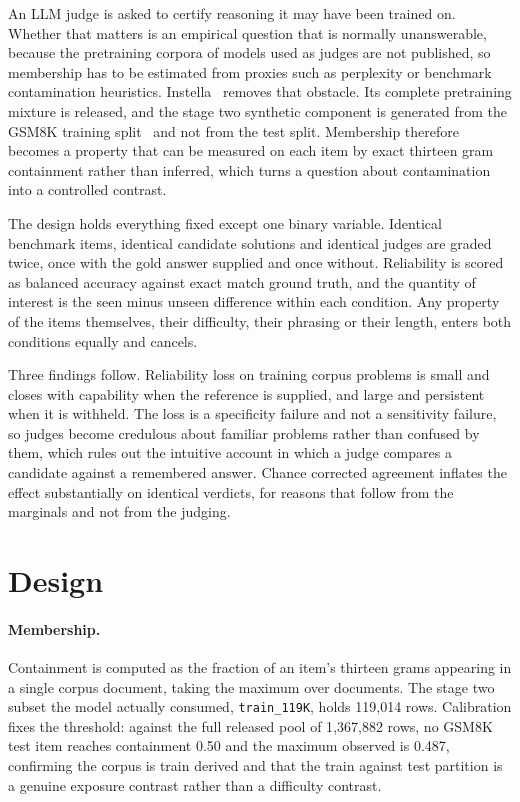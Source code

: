 An LLM judge is asked to certify reasoning it may have been trained on. Whether that matters
is an empirical question that is normally unanswerable, because the pretraining corpora of
models used as judges are not published, so membership has to be estimated from proxies such
as perplexity or benchmark contamination heuristics. Instella~\citep{instella2025} removes
that obstacle. Its complete pretraining mixture is released, and the stage two synthetic
component is generated from the GSM8K training split~\citep{cobbe2021gsm8k} and not from the
test split. Membership therefore becomes a property that can be measured on each item by
exact thirteen gram containment rather than inferred, which turns a question about
contamination into a controlled contrast.

The design holds everything fixed except one binary variable. Identical benchmark items,
identical candidate solutions and identical judges are graded twice, once with the gold
answer supplied and once without. Reliability is scored as balanced accuracy against exact
match ground truth, and the quantity of interest is the seen minus unseen difference within
each condition. Any property of the items themselves, their difficulty, their phrasing or
their length, enters both conditions equally and cancels.

Three findings follow. Reliability loss on training corpus problems is small and closes with
capability when the reference is supplied, and large and persistent when it is withheld. The
loss is a specificity failure and not a sensitivity failure, so judges become credulous
about familiar problems rather than confused by them, which rules out the intuitive account
in which a judge compares a candidate against a remembered answer. Chance corrected
agreement inflates the effect substantially on identical verdicts, for reasons that follow
from the marginals and not from the judging.

\section{Design}

\paragraph{Membership.} Containment is computed as the fraction of an item's thirteen grams
appearing in a single corpus document, taking the maximum over documents. The stage two
subset the model actually consumed, \texttt{train\_119K}, holds 119{,}014 rows. Calibration
fixes the threshold: against the full released pool of 1{,}367{,}882 rows, no GSM8K test item
reaches containment 0.50 and the maximum observed is 0.487, confirming the corpus is train
derived and that the train against test partition is a genuine exposure contrast rather than
a difficulty contrast.

